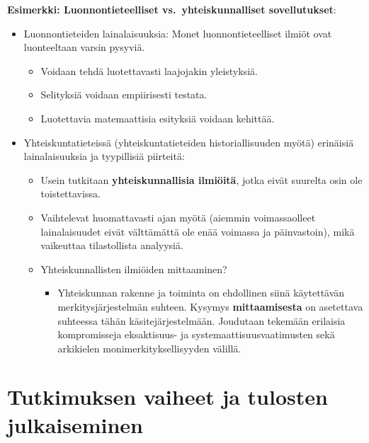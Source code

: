 \documentclass[
]{book}
\providecommand{\tightlist}{%
  \setlength{\itemsep}{0pt}\setlength{\parskip}{0pt}}
\begin{document}
\hfill\break

\begin{eblock}{}

\textbf{Esimerkki: Luonnontieteelliset vs.~yhteiskunnalliset sovellutukset}:

\begin{itemize}
\tightlist
\item
  Luonnontieteiden lainalaisuuksia: Monet luonnontieteelliset ilmiöt ovat luonteeltaan varsin pysyviä.

  \begin{itemize}
  \tightlist
  \item
    Voidaan tehdä luotettavasti laajojakin yleistyksiä.
  \item
    Selityksiä voidaan empiirisesti testata.
  \item
    Luotettavia matemaattisia esityksiä voidaan kehittää.
  \end{itemize}
\item
  Yhteiskuntatieteissä (yhteiskuntatieteiden historiallisuuden myötä) erinäisiä lainalaisuuksia ja tyypillisiä piirteitä:

  \begin{itemize}
  \tightlist
  \item
    Usein tutkitaan \textbf{yhteiskunnallisia ilmiöitä}, jotka eivät suurelta osin ole toistettavissa.
  \item
    Vaihtelevat huomattavasti ajan myötä (aiemmin voimassaolleet lainalaisuudet eivät välttämättä ole enää voimassa ja päinvastoin), mikä vaikeuttaa tilastollista analyysiä.
  \item
    Yhteiskunnallisten ilmiöiden mittaaminen?

    \begin{itemize}
    \tightlist
    \item
      Yhteiskunnan rakenne ja toiminta on ehdollinen siinä käytettävän merkitysjärjestelmän suhteen. Kysymys \textbf{mittaamisesta} on asetettava suhteessa tähän käsitejärjestelmään. Joudutaan tekemään erilaisia kompromisseja eksaktisuus- ja systemaattisuusvaatimusten sekä arkikielen monimerkityksellisyyden välillä.
    \end{itemize}
  \end{itemize}
\end{itemize}

\end{eblock}

\hypertarget{alaluku25}{%
\section{Tutkimuksen vaiheet ja tulosten julkaiseminen}\label{alaluku25}}
\end{document}
